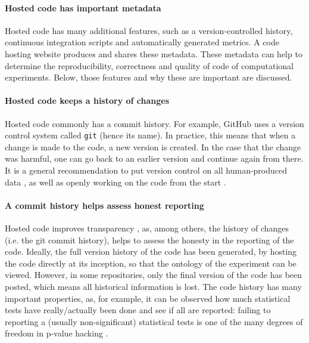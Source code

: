 \paragraph{Hosted code has important metadata}

Hosted code has many additional features, such as
a version-controlled history, continuous integration scripts
and automatically generated metrics.
A code hosting website produces and shares these metadata.
These metadata can help to determine the
reproducibility, correctness and quality of code
of computational experiments.
Below, those features and why these are important are discussed.

\paragraph{Hosted code keeps a history of changes}

Hosted code commonly has a commit history. For example, GitHub
uses a version control system called \verb|git| (hence its name).
In practice, this means that when a change is made to the code,
a new version is created. In the case that the change was harmful,
one can go back to an earlier version and continue again from there.
It is a general recommendation to put version control
on all human-produced data \cite{wilson2014best},
as well as openly working on the code from the start \cite{jimenez2017four}.

\paragraph{A commit history helps assess honest reporting}

Hosted code improves transparency \cite{gorgolewski2016practical},
as, among others, the history of changes (i.e. the git commit history), 
helps to assess the honesty in the reporting of the code. 
Ideally, the full version history of the code 
has been generated, by hosting the code directly at its inception,
so that the ontology of the experiment can be viewed.
However, in some repositories, only the final version of the code has been
posted, which means all historical information is lost.
The code history has many important properties,
as, for example, 
it can be observed how much statistical tests have really/actually been done 
and see if all are reported:
failing to reporting a (usually non-significant) statistical tests is 
one of the many degrees of freedom 
in p-value hacking \cite{wicherts2016degrees}.

